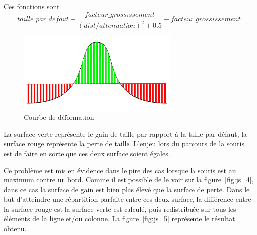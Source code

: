 Ces fonctions sont 
\begin{equation}
taille\_par\_defaut + \frac{facteur\_grossissement}{(dist/attenuation)^{2}+0.5}-facteur\_grossissement
\end{equation}

\begin{figure}[H]
  \centering
  \includegraphics[width=0.7\textwidth]{../resources/illustrations/js_3}
  \caption{Courbe de déformation}
    \label{fig:js_3}
\end{figure}

La surface verte représente le gain de taille par rapport à la taille par défaut, la surface rouge représente la perte de taille. L'enjeu lors du parcours de la souris est de faire en sorte que ces deux surface soient égales.

Ce problème est mis en évidence dans le pire des cas lorsque la souris est au maximum contre un bord. Comme il est possible de le voir sur la figure~\ref{fig:js_4}, dans ce cas la surface de gain est bien plus élevé que la surface de perte. Dans le but d'atteindre une répartition parfaite entre ces deux surface, la différence entre la surface rouge est la surface verte est calculé, puis   redistribuée sur tous les éléments de la ligne et/ou colonne. La figure~\ref{fig:js_5} représente le résultat obtenu.

